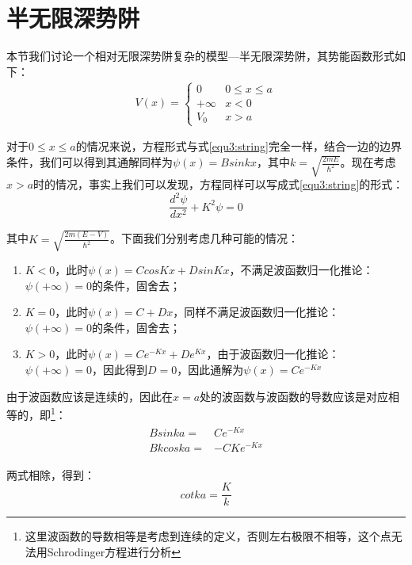 \section{半无限深势阱}
本节我们讨论一个相对无限深势阱复杂的模型---半无限深势阱，其势能函数形式如下：
\begin{align}
V(x)=\left\{
    \begin{array}{ll}
       0  & 0\leq x\leq a \\
        +\infty & x<0\\
        V_0 & x>a
    \end{array}\right.
\end{align}

对于$0\leq x\leq a$的情况来说，方程形式与式\ref{equ3:string}完全一样，结合一边的边界条件，我们可以得到其通解同样为$\psi(x)=Bsinkx$，其中$k=\sqrt{\frac{2mE}{\hbar^2}}$。现在考虑$x>a$时的情况，事实上我们可以发现，方程同样可以写成式\ref{equ3:string}的形式：
\begin{equation}
    \frac{d^2\psi}{dx^2}+K^2\psi=0
\end{equation}

其中$K=\sqrt{\frac{2m(E-V)}{\hbar^2}}$。下面我们分别考虑几种可能的情况：
\begin{enumerate}
    \item $K<0$，此时$\psi(x)=CcosKx+DsinKx$，不满足波函数归一化推论：$\psi(+\infty)=0$的条件，固舍去；
    \item $K=0$，此时$\psi(x)=C+Dx$，同样不满足波函数归一化推论：$\psi(+\infty)=0$的条件，固舍去；
    \item $K>0$，此时$\psi(x)=Ce^{-Kx}+De^{Kx}$，由于波函数归一化推论：$\psi(+\infty)=0$，因此得到$D=0$，因此通解为$\psi(x)=Ce^{-Kx}$
\end{enumerate}

由于波函数应该是连续的，因此在$x=a$处的波函数与波函数的导数应该是对应相等的，即\footnote{这里波函数的导数相等是考虑到连续的定义，否则左右极限不相等，这个点无法用Schrodinger方程进行分析}：
\begin{align}
    \begin{split}\label{equ3:hinf_pre}
        Bsinka= & Ce^{-Kx}\\
        Bkcoska= & -CKe^{-Kx}
    \end{split}
\end{align}

两式相除，得到：
\begin{equation}\label{equ3:hinf}
    cotka=\frac{K}{k}
\end{equation}

